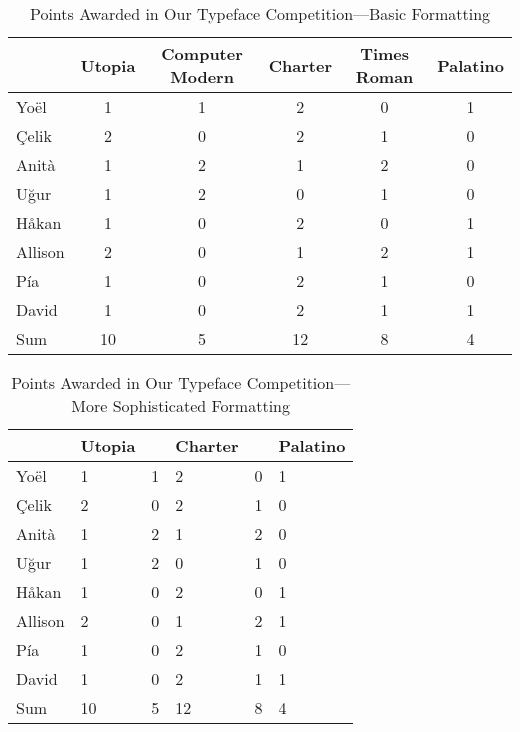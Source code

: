 


\begin{table}[t]
	\caption{Points Awarded in Our Typeface Competition---Basic Formatting}
	\label{tab:basic_formatting}
	\begin{tabular}{@{}lccccc@{}}
		\toprule
					&	Utopia	&	Computer Modern	&	Charter	&	Times Roman	&	Palatino	\\
		\midrule
		Yo\"{e}l	&	1	&	1	&	2	&	0	&	1	\\
		\c{C}elik	&	2	&	0	&	2	&	1	&	0	\\
		Anit\`{a}	&	1	&	2	&	1	&	2	&	0	\\
		U\u{g}ur	&	1	&	2	&	0	&	1	&	0	\\
		H\r{a}kan	&	1	&	0	&	2	&	0	&	1	\\
		Allison		&	2	&	0	&	1	&	2	&	1	\\
		P\'{i}a		&	1	&	0	&	2	&	1	&	0	\\
		David		&	1	&	0	&	2	&	1	&	1	\\
		\midrule
		Sum			&  10	&	5	&	12	&	8	&	4	\\
		\bottomrule
	\end{tabular}
\end{table}

\begin{table}[b]
	\caption{Points Awarded in Our Typeface Competition---More Sophisticated Formatting}
	\label{tab:advanced_formatting}
	\renewcommand\cellalign{ct}
	\begin{tabularx}{\textwidth}{ @{} L *{5}{T{2.0}} }
		\toprule
			&	{Utopia}
			&	{}
			&	{Charter}
			&	{}
			&	{Palatino}
			\\
		\midrule
		Yo\"{e}l  	& 	1	&	1	&	2	&	0	&	1	\\
		\c{C}elik	&	2	&	0	&	2	&	1	&	0	\\
		Anit\`{a}	&	1	&	2	&	1	&	2	&	0	\\
		U\u{g}ur	&	1	&	2	&	0	&	1	&	0	\\
		H\r{a}kan	&	1	&	0	&	2	&	0	&	1	\\
		Allison		&	2	&	0	&	1	&	2	&	1	\\
		P\'ia		&	1	&	0	&	2	&	1	&	0	\\
		David		&	1	&	0	&	2	&	1	&	1	\\
		\midrule
		Sum			&  10	&	5	&	12	&	8	&	4	\\
		\bottomrule
	\end{tabularx}
	\parnotes%
\end{table}

